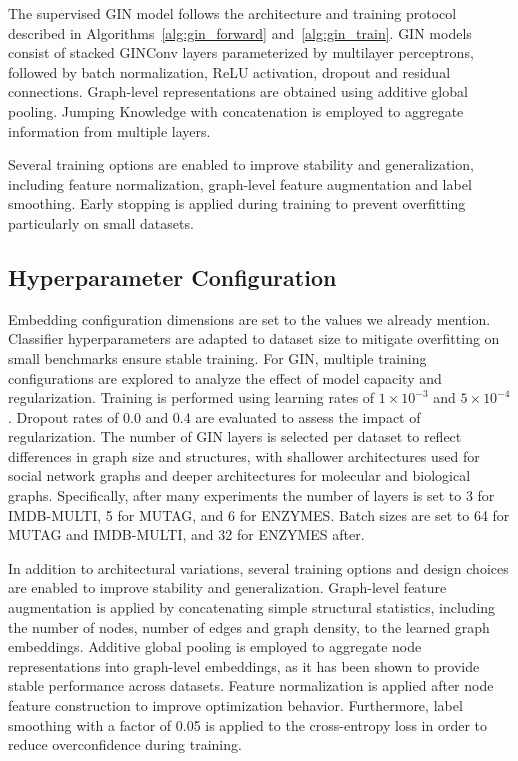 The supervised GIN model follows the architecture and
training protocol described in Algorithms~\ref{alg:gin_forward} and~\ref{alg:gin_train}.
GIN models consist of stacked GINConv layers parameterized by multilayer perceptrons, followed by
batch normalization, ReLU activation, dropout and residual connections.
Graph-level representations are obtained using additive global pooling.
Jumping Knowledge with concatenation is employed to aggregate information from multiple layers.

Several training options are enabled to improve stability and generalization, including feature
normalization, graph-level feature augmentation  and label smoothing.
Early stopping is applied during training to prevent overfitting particularly  on small datasets.


\subsection{Hyperparameter Configuration}
Embedding configuration dimensions are set to the values we already mention.
Classifier hyperparameters are adapted to dataset size to mitigate overfitting on small benchmarks 
ensure stable training.
For GIN, multiple training configurations are explored to analyze the effect of model capacity
and regularization.
Training is performed using learning rates of $1 \times 10^{-3}$ and $5 \times 10^{-4}$.
Dropout rates of 0.0 and 0.4 are evaluated to assess the impact of regularization.
The number of GIN layers is selected per dataset to reflect differences in graph size and structures, 
with shallower architectures used for social network graphs and deeper architectures for molecular and biological graphs.
Specifically, after many experiments the number of layers is set to 3 for IMDB-MULTI, 5 for MUTAG, and 6 for ENZYMES.
Batch sizes are set to 64 for MUTAG and IMDB-MULTI, and 32 for ENZYMES after.

In addition to architectural variations, several training options and design choices are enabled
to improve stability and generalization.
Graph-level feature augmentation is applied by concatenating simple structural statistics,
including the number of nodes, number of edges and graph density, to the learned graph embeddings.
Additive global pooling is employed to aggregate node representations into graph-level embeddings,
as it has been shown to provide stable performance across datasets.
Feature normalization is applied after node feature construction to improve optimization behavior.
Furthermore, label smoothing with a factor of 0.05 is applied to the cross-entropy loss in order
to reduce overconfidence during training.

